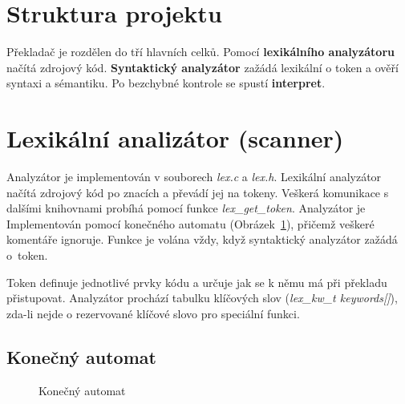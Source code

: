\documentclass[a4paper, 11pt, titlepage]{article}
\begin{document}
\section{Struktura projektu}
Překladač je rozdělen do tří hlavních celků. Pomocí \textbf{lexikálního analyzátoru} načítá zdrojový kód. \textbf{Syntaktický analyzátor} zažádá lexikální o token a ověří syntaxi a sémantiku. Po bezchybné kontrole se spustí \textbf{interpret}.  

\section{Lexikální analizátor (scanner)}
Analyzátor je implementován v souborech \textit{lex.c} a \textit{lex.h}. Lexikální analyzátor načítá zdrojový kód po znacích a převádí jej na tokeny. Veškerá komunikace s dalšími knihovnami probíhá pomocí funkce \textit{lex\_get\_token}. Analyzátor je Implementován pomocí konečného automatu (Obrázek~\ref{picture_1:konecny_automat}), přičemž veškeré komentáře ignoruje. Funkce je volána vždy, když syntaktický analyzátor zažádá o~token. 

Token definuje jednotlivé prvky kódu a určuje jak se k němu má při překladu přistupovat. Analyzátor prochází tabulku klíčových slov (\textit{lex\_kw\_t keywords[]}), zda-li nejde o rezervované klíčové slovo pro speciální funkci.

\subsection{Konečný automat}

\begin{figure}[h]
	\centering
	\caption{Konečný automat}
	\label{picture_1:konecny_automat}
\end{figure}
\end{document}
